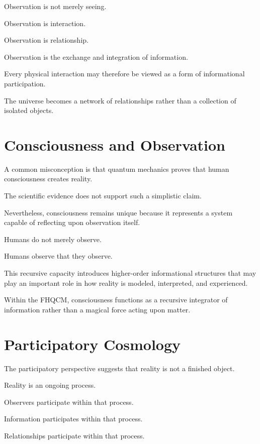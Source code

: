Observation is not merely seeing.

Observation is interaction.

Observation is relationship.

Observation is the exchange and integration of information.

Every physical interaction may therefore be viewed as a form of informational participation.

The universe becomes a network of relationships rather than a collection of isolated objects.

\section{Consciousness and Observation}

A common misconception is that quantum mechanics proves that human consciousness creates reality.

The scientific evidence does not support such a simplistic claim.

Nevertheless, consciousness remains unique because it represents a system capable of reflecting upon observation itself.

Humans do not merely observe.

Humans observe that they observe.

This recursive capacity introduces higher-order informational structures that may play an important role in how reality is modeled, interpreted, and experienced.

Within the FHQCM, consciousness functions as a recursive integrator of information rather than a magical force acting upon matter.


\section{Participatory Cosmology}

The participatory perspective suggests that reality is not a finished object.

Reality is an ongoing process.

Observers participate within that process.

Information participates within that process.

Relationships participate within that process.

